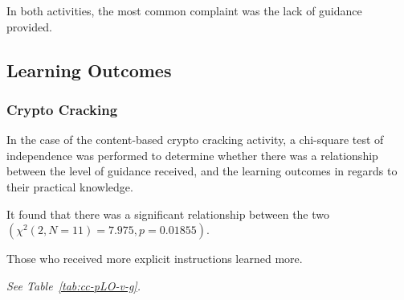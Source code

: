 In both activities, the most common complaint was the lack of guidance provided. 



    



    \subsection{Learning Outcomes}







        \subsubsection*{Crypto Cracking}



            In the case of the content-based crypto cracking activity, a chi-square test of independence was performed to determine whether there was a relationship between the level of guidance received, and the learning outcomes in regards to their practical knowledge. %



It found that there was a significant relationship between the two $(\chi^2(2, N=11)=7.975,  p = 0.01855)$. %



Those who received more explicit instructions learned more. %



\emph{See Table~\ref{tab:cc-pLO-v-g}.}







